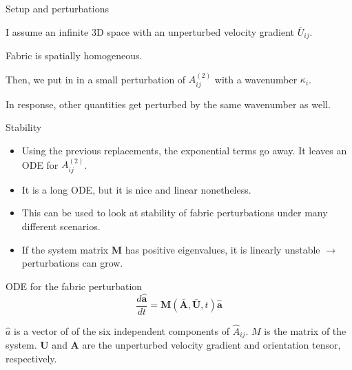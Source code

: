 \documentclass{beamer}
\begin{document}
\begin{frame}{Setup and perturbations}
   \begin{itemize} 
         \small{
         \item I assume an infinite 3D space with an unperturbed velocity gradient $\bar{U}_{ij}$.
      \item Fabric is spatially homogeneous.
      \item Then, we put in in a small perturbation of $A^{(2)}_{ij}$ with a wavenumber $\kappa_i$.
      \item In response, other quantities get perturbed by the same wavenumber as well.
      }
   \end{itemize}
\end{frame}

\begin{frame}{Stability}
   \begin{itemize}
      \item Using the previous replacements, the exponential terms go away. It leaves an ODE for $A^{(2)}_{ij}$.
      \item It is a long ODE, but it is nice and linear nonetheless.
      \item This can be used to look at stability of fabric perturbations under many different scenarios.
      \item If the system matrix $\mathbf{M}$ has positive eigenvalues, it is linearly unstable $\rightarrow$ perturbations can grow.
   \end{itemize}
   \begin{block}{ODE for the fabric perturbation}
\begin{equation}
   \frac{d \hat{\mathbf{a}}}{dt} = \mathbf{M} \left( \bar{\mathbf{A}},\bar{\mathbf{U}}, t \right) \hat{\mathbf{a}}
\end{equation}

\small{$\hat{a}$ is a vector of of the six independent components of $\hat{A}_{ij}$. $M$ is the matrix of the system. $\mathbf{U}$ and $\mathbf{A}$ are the unperturbed velocity gradient and orientation tensor, respectively.}
\end{block}

\end{frame}
\end{document}
